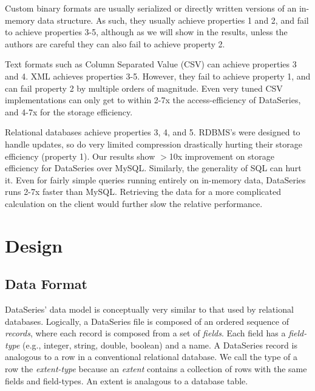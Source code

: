\documentclass{acm_proc_article-sp}
\begin{document}
Custom binary formats are usually serialized or directly written
versions of an in-memory data structure.  As such, they usually
achieve properties 1 and 2, and fail to achieve properties 3-5,
although as we will show in the results, unless the authors are
careful they can also fail to achieve property 2.

Text formats such as Column Separated Value (CSV) can
achieve properties 3 and 4. XML achieves properties 3-5.  However,
they fail to achieve property 1, and can fail property 2 by multiple
orders of magnitude.  Even very tuned CSV
implementations can only get to within 2-7x the
access-efficiency of DataSeries, and 4-7x for the storage
efficiency.

Relational databases achieve properties 3, 4, and 5. RDBMS's were
designed to handle updates, so do very limited compression drastically
hurting their storage efficiency (property 1).  Our results show
$>$10x improvement on storage efficiency for DataSeries over
MySQL. 
Similarly, the generality of SQL can hurt it.  Even for fairly simple
queries running entirely on in-memory data, DataSeries runs 2-7x
faster than MySQL. 
Retrieving the data for a more complicated
calculation on the client would further slow the relative performance.

\section{Design}\label{sec:design}

\subsection{Data Format}
DataSeries' data model is conceptually very similar to that used by
relational databases.  Logically, a DataSeries file is composed of an
ordered sequence of {\it records}, where each record is composed from
a set of {\it fields}. Each field has a {\it field-type} (e.g.,
integer, string, double, boolean) and a name. A DataSeries record is
analogous to a row in a conventional relational database. We call the
type of a row the {\it extent-type} because an {\it extent} contains a
collection of rows with the same fields and field-types. An extent is
analagous to a database table.
\end{document}
